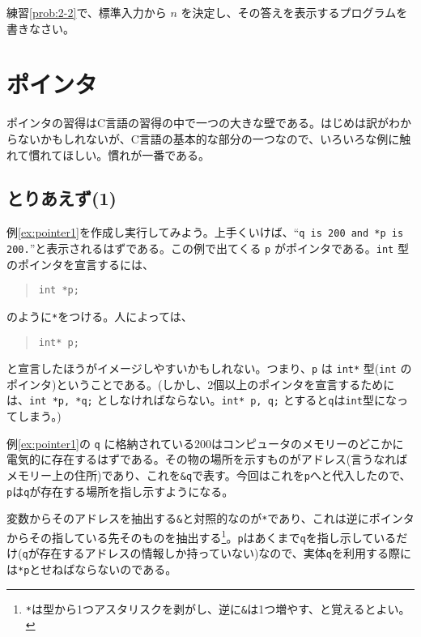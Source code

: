 \begin{renshuu}\label{prob:4-1}
    練習\ref{prob:2-2}で、標準入力から \(n\) を決定し、その答えを表示するプログラムを書きなさい。
\end{renshuu}

\section{ポインタ}

ポインタの習得はC言語の習得の中で一つの大きな壁である。はじめは訳がわからないかもしれないが、C言語の基本的な部分の一つなので、いろいろな例に触れて慣れてほしい。慣れが一番である。

\subsection{とりあえず(1)}

例\ref{ex:pointer1}を作成し実行してみよう。上手くいけば、``\texttt{q is 200 and *p is 200.}''と表示されるはずである。この例で出てくる \texttt{p} がポインタである。\texttt{int} 型のポインタを宣言するには、
\begin{quote}
    \begin{verbatim}
int *p;
\end{verbatim}
\end{quote}
のように\texttt{*}をつける。人によっては、
\begin{quote}
    \begin{verbatim}
int* p;
\end{verbatim}
\end{quote}
と宣言したほうがイメージしやすいかもしれない。つまり、\texttt{p} は \texttt{int*} 型(\texttt{int} のポインタ)ということである。(しかし、2個以上のポインタを宣言するためには、\texttt{int *p, *q;} としなければならない。\texttt{int* p, q;} とすると\texttt{q}は\texttt{int}型になってしまう。)

例\ref{ex:pointer1}の \texttt{q} に格納されている\(200\)はコンピュータのメモリーのどこかに電気的に存在するはずである。その物の場所を示すものがアドレス(言うなればメモリー上の住所)であり、これを\texttt{\&q}で表す。今回はこれを\texttt{p}へと代入したので、\texttt{p}は\texttt{q}が存在する場所を指し示すようになる。

変数からそのアドレスを抽出する\texttt{\&}と対照的なのが\texttt{*}であり、これは逆にポインタからその指している先そのものを抽出する\footnote{\texttt{*}は型から1つアスタリスクを剥がし、逆に\texttt{\&}は1つ増やす、と覚えるとよい。}。\texttt{p}はあくまで\texttt{q}を指し示しているだけ(\texttt{q}が存在するアドレスの情報しか持っていない)なので、実体\texttt{q}を利用する際には\texttt{*p}とせねばならないのである。

